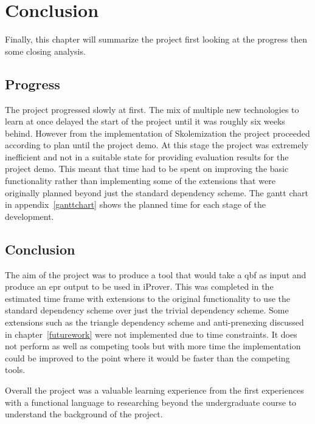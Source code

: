 \chapter{Conclusion}
Finally, this chapter will summarize the project first looking at the progress then some closing analysis.

\section{Progress}
The project progressed slowly at first. The mix of multiple new technologies to learn at once delayed the start of the project until it was roughly six weeks behind. However from the implementation of Skolemization the project proceeded according to plan until the project demo. At this stage the project was extremely inefficient and not in a suitable state for providing evaluation results for the project demo. This meant that time had to be spent on improving the basic functionality rather than implementing some of the extensions that were originally planned beyond just the standard dependency scheme. The gantt chart in appendix~\ref{ganttchart} shows the planned time for each stage of the development.

\section{Conclusion}
The aim of the project was to produce a tool that would take a \gls{qbf} as input and produce an \gls{epr} output to be used in iProver. This was completed in the estimated time frame with extensions to the original functionality to use the standard dependency scheme over just the trivial dependency scheme. Some extensions such as the triangle dependency scheme and anti-prenexing discussed in chapter~\ref{futurework} were not implemented due to time constraints. It does not perform as well as competing tools but with more time the implementation could be improved to the point where it would be faster than the competing tools.

Overall the project was a valuable learning experience from the first experiences with a functional language to researching beyond the undergraduate course to understand the background of the project.
